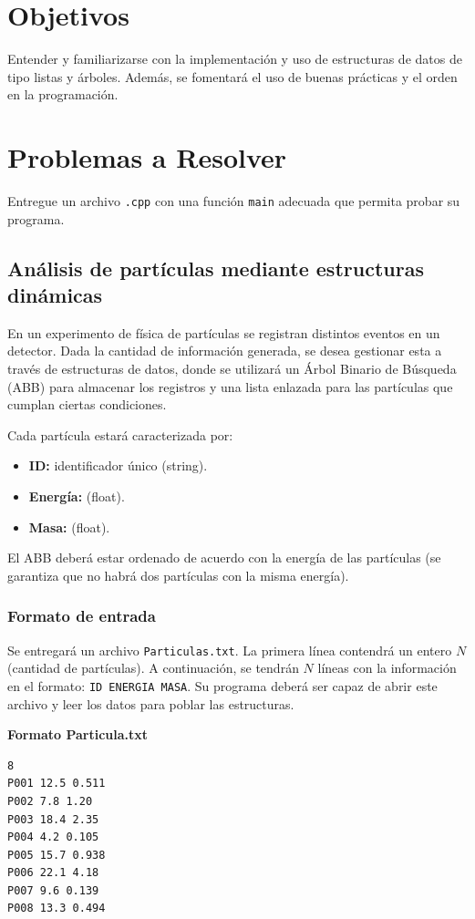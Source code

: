 \documentclass[11pt, letterpaper]{article}
\begin{document}
\section{Objetivos}
Entender y familiarizarse con la implementación y uso de estructuras de datos de tipo listas y árboles. Además, se fomentará el uso de buenas prácticas y el orden en la programación.

\section{Problemas a Resolver}
Entregue un archivo \texttt{.cpp} con una función \texttt{main} adecuada que permita probar su programa.

\subsection{Análisis de partículas mediante estructuras dinámicas}
En un experimento de física de partículas se registran distintos eventos en un detector. Dada la cantidad de información generada, se desea gestionar esta a través de estructuras de datos, donde se utilizará un Árbol Binario de Búsqueda (ABB) para almacenar los registros y una lista enlazada para las partículas que cumplan ciertas condiciones.

Cada partícula estará caracterizada por:
\begin{itemize}[noitemsep, topsep=0pt]
    \item \textbf{ID:} identificador único (string).
    \item \textbf{Energía:} (float).
    \item \textbf{Masa:} (float).
\end{itemize}
El ABB deberá estar ordenado de acuerdo con la energía de las partículas (se garantiza que no habrá dos partículas con la misma energía).

\subsubsection*{Formato de entrada}
Se entregará un archivo \texttt{Particulas.txt}. La primera línea contendrá un entero $N$ (cantidad de partículas). A continuación, se tendrán $N$ líneas con la información en el formato: \texttt{ID ENERGIA MASA}. Su programa deberá ser capaz de abrir este archivo y leer los datos para poblar las estructuras.

\textbf{Formato Particula.txt}

\begin{lstlisting}[language=bash]
8
P001 12.5 0.511
P002 7.8 1.20
P003 18.4 2.35
P004 4.2 0.105
P005 15.7 0.938
P006 22.1 4.18
P007 9.6 0.139
P008 13.3 0.494
\end{lstlisting}
\end{document}
